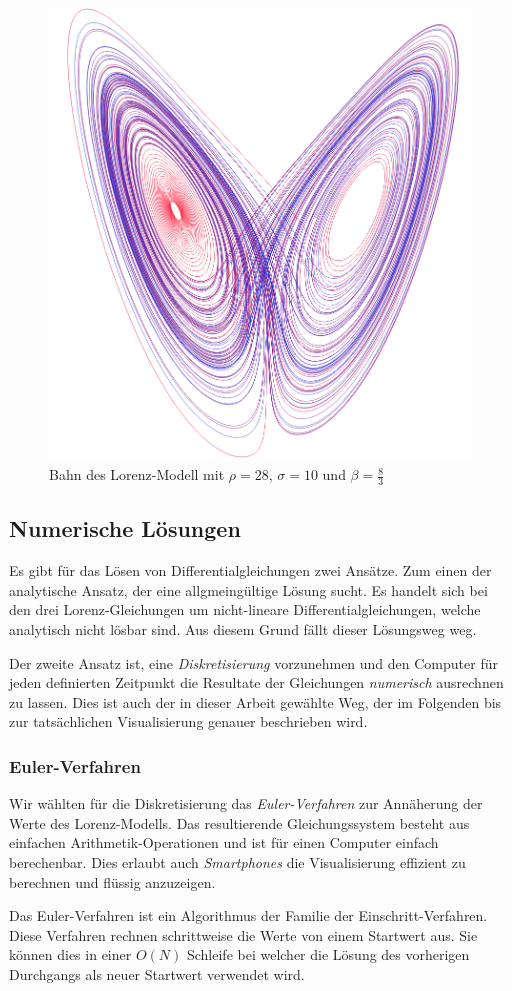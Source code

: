 \begin{figure}
	\centering
	\includegraphics[width=0.3\linewidth]{lorenz/assets/lorenz-modell/lorenz-modell}
	\caption{Bahn des Lorenz-Modell mit $\rho = 28$, $\sigma = 10$ und $\beta = \frac{8}{3}$}
	\label{fig:lorenz-modell}
\end{figure}


\subsection{Numerische Lösungen}
Es gibt für das Lösen von Differentialgleichungen zwei Ansätze. Zum einen der analytische Ansatz, der eine allgmeingültige Lösung sucht. Es handelt sich bei den drei Lorenz-Gleichungen um nicht-lineare Differentialgleichungen, welche analytisch nicht lösbar sind. Aus diesem Grund fällt dieser Lösungsweg weg. 

Der zweite Ansatz ist, eine \textit{Diskretisierung} vorzunehmen und den Computer für jeden definierten Zeitpunkt die Resultate der Gleichungen \textit{numerisch} ausrechnen zu lassen. Dies ist auch der in dieser Arbeit gewählte Weg, der im Folgenden bis zur tatsächlichen Visualisierung genauer beschrieben wird.

\subsubsection{Euler-Verfahren}

Wir wählten für die Diskretisierung das \textit{Euler-Verfahren} zur Annäherung der Werte des Lorenz-Modells. Das resultierende Gleichungssystem besteht aus einfachen Arithmetik-Operationen und ist für einen Computer einfach berechenbar. Dies erlaubt auch \textit{Smartphones} die Visualisierung effizient zu berechnen und flüssig anzuzeigen.

Das Euler-Verfahren ist ein Algorithmus der Familie der Einschritt-Verfahren. Diese Verfahren rechnen schrittweise die Werte von einem Startwert aus. Sie können dies in einer $ O(N) $ Schleife bei welcher die Lösung des vorherigen Durchgangs als neuer Startwert verwendet wird. 

